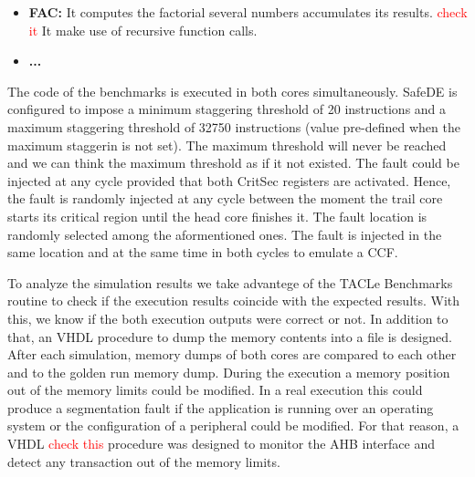 \begin{itemize}
    \item \textbf{FAC:} It computes the factorial several numbers accumulates its results. \textcolor{red}{check it} It make use of recursive function calls.
    \item \textbf{...} 
\end{itemize}

The code of the benchmarks is executed in both cores simultaneously. SafeDE is configured to impose a minimum staggering threshold of 20 instructions and a maximum staggering threshold of 32750 instructions (value pre-defined when the maximum staggerin is not set). The maximum threshold will never be reached and we can think the maximum threshold as if it not existed. The fault could be injected at any cycle provided that both CritSec registers are activated. Hence, the fault is randomly injected at any cycle between the moment the trail core starts its critical region until the head core finishes it. The fault location is randomly selected among the aformentioned ones. The fault is injected in the same location and at the same time in both cycles to emulate a CCF.



To analyze the simulation results we take advantege of the TACLe Benchmarks routine to check if the execution results coincide with the expected results. With this, we know if the both execution outputs were correct or not. In addition to that, an VHDL procedure to dump the memory contents into a file is designed. After each simulation, memory dumps of both cores are compared to each other and to the golden run memory dump. During the execution a memory position out of the memory limits could be modified. In a real execution this could produce a segmentation fault if the application is running over an operating system or the configuration of a peripheral could be modified. For that reason, a VHDL \textcolor{red}{check this} procedure was designed to monitor the AHB interface and detect any transaction out of the memory limits.

